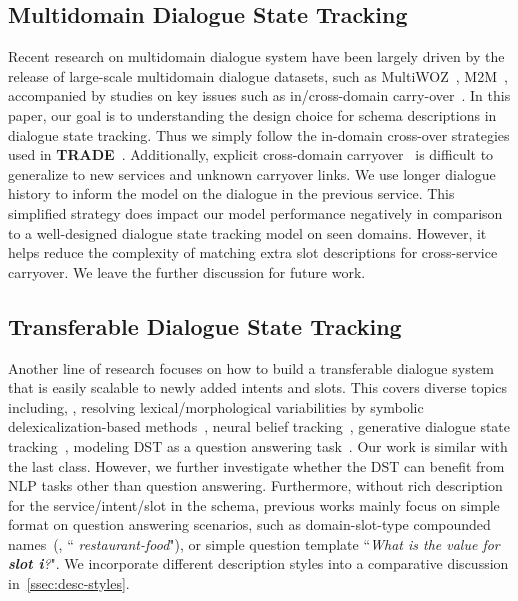 \subsection{Multidomain Dialogue State Tracking}
\label{ssec:sgd:multidomain}
Recent research on multidomain dialogue system have been largely driven
by the release of large-scale multidomain dialogue datasets, such as
MultiWOZ~\citep{budzianowski2018multiwoz},
M2M~\citep{shah-etal-2018-bootstrapping}, accompanied by studies on key
issues such as in/cross-domain carry-over~\citep{ kim2019efficient}. In
this paper, our goal is to understanding the design choice for schema
descriptions in dialogue state tracking.  Thus we simply follow the
in-domain cross-over strategies used in {\bf
  TRADE}~\citep{wu2019transferable}. Additionally, explicit
cross-domain carryover~\citep{naik2018contextual} is difficult to
generalize to new services and unknown carryover links. We use longer
dialogue history to inform the model on the dialogue in the previous
service. This simplified strategy does impact our model performance
negatively in comparison to a well-designed dialogue state tracking
model on seen domains. However, it helps reduce the complexity of
matching extra slot descriptions for cross-service carryover. We leave
the further discussion for future work.

\subsection{Transferable Dialogue State Tracking}
\label{ssec:sgd:transfer-dialogue}
Another line of research focuses on how to build a transferable dialogue
system that is easily scalable to newly added intents and slots. This
covers diverse topics including, \eg, resolving lexical/morphological
variabilities by symbolic delexicalization-based
methods~\citep{henderson2014word, williams2016dialog}, neural belief
tracking~\citep{mrkvsic2017neural}, generative dialogue state
tracking~\citep{peng2020soloist, hosseini2020simple}, modeling DST as a
question answering task~\citep{zhang2019find, lee2019sumbt,
  gao2020machine, gao2019dialog}. Our work is similar with the last
class. However, we further investigate whether the DST can benefit
from NLP tasks other than question answering. Furthermore, without
rich description for the service/intent/slot in the schema, previous
works mainly focus on simple format on question answering scenarios,
such as domain-slot-type compounded names~(\eg, ``{\it
  restaurant-food}"), or simple question template ``{\it What is the
  value for {\bf slot i}?}". We incorporate different description
styles into a comparative discussion in~\autoref{ssec:desc-styles}.

